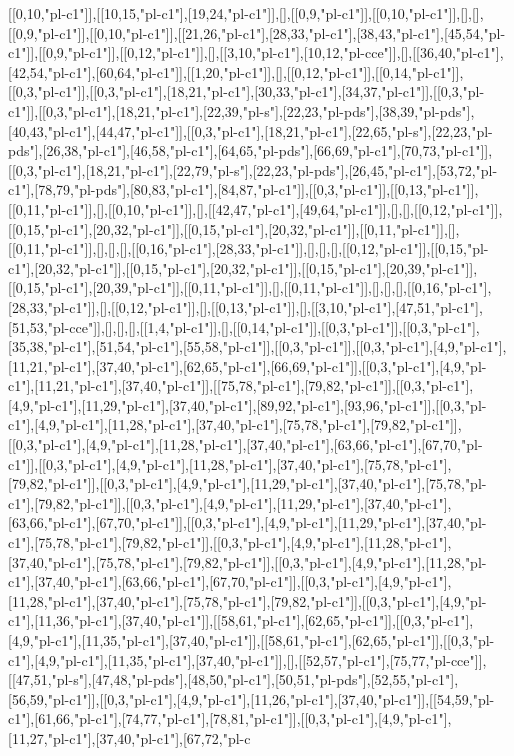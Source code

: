 [[0,10,"pl-c1"]],[[10,15,"pl-c1"],[19,24,"pl-c1"]],[],[[0,9,"pl-c1"]],[[0,10,"pl-c1"]],[],[],[[0,9,"pl-c1"]],[[0,10,"pl-c1"]],[[21,26,"pl-c1"],[28,33,"pl-c1"],[38,43,"pl-c1"],[45,54,"pl-c1"]],[[0,9,"pl-c1"]],[[0,12,"pl-c1"]],[],[[3,10,"pl-c1"],[10,12,"pl-cce"]],[],[[36,40,"pl-c1"],[42,54,"pl-c1"],[60,64,"pl-c1"]],[[1,20,"pl-c1"]],[],[[0,12,"pl-c1"]],[[0,14,"pl-c1"]],[[0,3,"pl-c1"]],[[0,3,"pl-c1"],[18,21,"pl-c1"],[30,33,"pl-c1"],[34,37,"pl-c1"]],[[0,3,"pl-c1"]],[[0,3,"pl-c1"],[18,21,"pl-c1"],[22,39,"pl-s"],[22,23,"pl-pds"],[38,39,"pl-pds"],[40,43,"pl-c1"],[44,47,"pl-c1"]],[[0,3,"pl-c1"],[18,21,"pl-c1"],[22,65,"pl-s"],[22,23,"pl-pds"],[26,38,"pl-c1"],[46,58,"pl-c1"],[64,65,"pl-pds"],[66,69,"pl-c1"],[70,73,"pl-c1"]],[[0,3,"pl-c1"],[18,21,"pl-c1"],[22,79,"pl-s"],[22,23,"pl-pds"],[26,45,"pl-c1"],[53,72,"pl-c1"],[78,79,"pl-pds"],[80,83,"pl-c1"],[84,87,"pl-c1"]],[[0,3,"pl-c1"]],[[0,13,"pl-c1"]],[[0,11,"pl-c1"]],[],[[0,10,"pl-c1"]],[],[[42,47,"pl-c1"],[49,64,"pl-c1"]],[],[],[[0,12,"pl-c1"]],[[0,15,"pl-c1"],[20,32,"pl-c1"]],[[0,15,"pl-c1"],[20,32,"pl-c1"]],[[0,11,"pl-c1"]],[],[[0,11,"pl-c1"]],[],[],[],[[0,16,"pl-c1"],[28,33,"pl-c1"]],[],[],[],[[0,12,"pl-c1"]],[[0,15,"pl-c1"],[20,32,"pl-c1"]],[[0,15,"pl-c1"],[20,32,"pl-c1"]],[[0,15,"pl-c1"],[20,39,"pl-c1"]],[[0,15,"pl-c1"],[20,39,"pl-c1"]],[[0,11,"pl-c1"]],[],[[0,11,"pl-c1"]],[],[],[],[[0,16,"pl-c1"],[28,33,"pl-c1"]],[],[[0,12,"pl-c1"]],[],[[0,13,"pl-c1"]],[],[[3,10,"pl-c1"],[47,51,"pl-c1"],[51,53,"pl-cce"]],[],[],[],[[1,4,"pl-c1"]],[],[[0,14,"pl-c1"]],[[0,3,"pl-c1"]],[[0,3,"pl-c1"],[35,38,"pl-c1"],[51,54,"pl-c1"],[55,58,"pl-c1"]],[[0,3,"pl-c1"]],[[0,3,"pl-c1"],[4,9,"pl-c1"],[11,21,"pl-c1"],[37,40,"pl-c1"],[62,65,"pl-c1"],[66,69,"pl-c1"]],[[0,3,"pl-c1"],[4,9,"pl-c1"],[11,21,"pl-c1"],[37,40,"pl-c1"]],[[75,78,"pl-c1"],[79,82,"pl-c1"]],[[0,3,"pl-c1"],[4,9,"pl-c1"],[11,29,"pl-c1"],[37,40,"pl-c1"],[89,92,"pl-c1"],[93,96,"pl-c1"]],[[0,3,"pl-c1"],[4,9,"pl-c1"],[11,28,"pl-c1"],[37,40,"pl-c1"],[75,78,"pl-c1"],[79,82,"pl-c1"]],[[0,3,"pl-c1"],[4,9,"pl-c1"],[11,28,"pl-c1"],[37,40,"pl-c1"],[63,66,"pl-c1"],[67,70,"pl-c1"]],[[0,3,"pl-c1"],[4,9,"pl-c1"],[11,28,"pl-c1"],[37,40,"pl-c1"],[75,78,"pl-c1"],[79,82,"pl-c1"]],[[0,3,"pl-c1"],[4,9,"pl-c1"],[11,29,"pl-c1"],[37,40,"pl-c1"],[75,78,"pl-c1"],[79,82,"pl-c1"]],[[0,3,"pl-c1"],[4,9,"pl-c1"],[11,29,"pl-c1"],[37,40,"pl-c1"],[63,66,"pl-c1"],[67,70,"pl-c1"]],[[0,3,"pl-c1"],[4,9,"pl-c1"],[11,29,"pl-c1"],[37,40,"pl-c1"],[75,78,"pl-c1"],[79,82,"pl-c1"]],[[0,3,"pl-c1"],[4,9,"pl-c1"],[11,28,"pl-c1"],[37,40,"pl-c1"],[75,78,"pl-c1"],[79,82,"pl-c1"]],[[0,3,"pl-c1"],[4,9,"pl-c1"],[11,28,"pl-c1"],[37,40,"pl-c1"],[63,66,"pl-c1"],[67,70,"pl-c1"]],[[0,3,"pl-c1"],[4,9,"pl-c1"],[11,28,"pl-c1"],[37,40,"pl-c1"],[75,78,"pl-c1"],[79,82,"pl-c1"]],[[0,3,"pl-c1"],[4,9,"pl-c1"],[11,36,"pl-c1"],[37,40,"pl-c1"]],[[58,61,"pl-c1"],[62,65,"pl-c1"]],[[0,3,"pl-c1"],[4,9,"pl-c1"],[11,35,"pl-c1"],[37,40,"pl-c1"]],[[58,61,"pl-c1"],[62,65,"pl-c1"]],[[0,3,"pl-c1"],[4,9,"pl-c1"],[11,35,"pl-c1"],[37,40,"pl-c1"]],[],[[52,57,"pl-c1"],[75,77,"pl-cce"]],[[47,51,"pl-s"],[47,48,"pl-pds"],[48,50,"pl-c1"],[50,51,"pl-pds"],[52,55,"pl-c1"],[56,59,"pl-c1"]],[[0,3,"pl-c1"],[4,9,"pl-c1"],[11,26,"pl-c1"],[37,40,"pl-c1"]],[[54,59,"pl-c1"],[61,66,"pl-c1"],[74,77,"pl-c1"],[78,81,"pl-c1"]],[[0,3,"pl-c1"],[4,9,"pl-c1"],[11,27,"pl-c1"],[37,40,"pl-c1"],[67,72,"pl-c